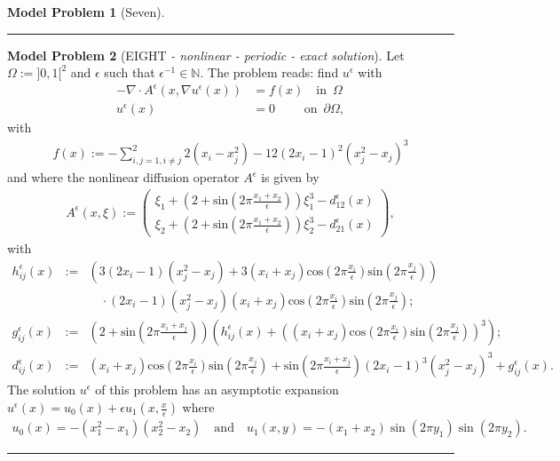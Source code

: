 \documentclass[a4paper,11pt]{article}
\theoremstyle{definition}
\newtheorem{modelproblem}{Model Problem} %
\begin{document}
\begin{modelproblem}[Seven]

\end{modelproblem}
\hrule

\begin{modelproblem}[EIGHT {\it- nonlinear - periodic - exact solution}]
Let $\Omega := ]0,1[^2$ and $\epsilon$ such that $\epsilon^{-1} \in \mathbb{N}$.  The problem reads: find $u^{\epsilon}$ with
\begin{align*}
- \nabla \cdot A^{\epsilon}(x,\nabla u^{\epsilon}(x)) &= f(x) \quad \mbox{in} \enspace \Omega \\
u^{\epsilon}(x) &= 0 \hspace{28pt} \mbox{on} \enspace \partial \Omega,
\end{align*}
with
\begin{eqnarray*}
 f(x) := - \sum_{i,j=1,i\neq j}^2  2(x_i - x_j^2 ) - 12 (2 x_i - 1)^2(x_j^2 - x_j)^3
\end{eqnarray*}
and where the nonlinear diffusion operator  $A^{\epsilon}$ is given by
\begin{eqnarray*}
A^{\epsilon}(x,\xi) := \left( \begin{array}{c}
                                 \xi_1 + (2 + \mbox{sin}(2 \pi \frac{x_1 + x_2}{\epsilon} )) \xi_1^3 - d^{\epsilon}_{12}(x) \\
                                 \xi_2 + (2 + \mbox{sin}(2 \pi \frac{x_1 + x_2}{\epsilon} )) \xi_2^3 - d^{\epsilon}_{21}(x)
                               \end{array}\right),
\end{eqnarray*}
with
\begin{eqnarray*}
h_{ij}^{\epsilon}(x) &:=& \left( 3 ( 2 x_i - 1) (x_j^2 - x_j )
                   + 3 ( x_i + x_j ) \mbox{cos}( 2 \pi \frac{x_i}{\epsilon} ) \mbox{sin}( 2 \pi \frac{x_j}{\epsilon} ) \right)\\
&\enspace& \quad \cdot
 ( 2 x_i - 1) (x_j^2 - x_j ) ( x_i + x_j ) \mbox{cos}( 2 \pi \frac{x_i}{\epsilon} ) \mbox{sin}( 2 \pi \frac{x_j}{\epsilon} ); \\
g_{ij}^{\epsilon}(x) &:=& (2 + \mbox{sin}( 2 \pi \frac{x_i + x_j}{\epsilon} ) ) \left( h_{ij}^{\epsilon}(x) + \left( ( x_i + x_j ) \mbox{cos}( 2 \pi \frac{x_i}{\epsilon} ) \mbox{sin}( 2 \pi \frac{x_j}{\epsilon} ) \right)^3 \right); \\
 d^{\epsilon}_{ij}(x) &:=& ( x_i + x_j ) \mbox{cos}( 2 \pi \frac{x_i}{\epsilon} ) \mbox{sin}( 2 \pi \frac{x_j}{\epsilon} ) + \mbox{sin}( 2 \pi \frac{x_i + x_j}{\epsilon} ) (2 x_i - 1 )^3 ( x_j^2 - x_j )^3 + g_{ij}^{\epsilon}(x).
\end{eqnarray*}
The solution $u^{\epsilon}$ of this problem has an asymptotic expansion $u^{\epsilon}(x) = u_0(x) + \epsilon u_1(x,\frac{x}{\epsilon})$ where
\begin{eqnarray*}
 u_0(x) = - (x_1^2 - x_1)(x_2^2 - x_2) \quad \mbox{and} \quad u_1(x,y) = - (x_1 + x_2) \sin(2 \pi y_1) \sin(2 \pi y_2).
\end{eqnarray*}

\end{modelproblem}
\hrule
\end{document}
